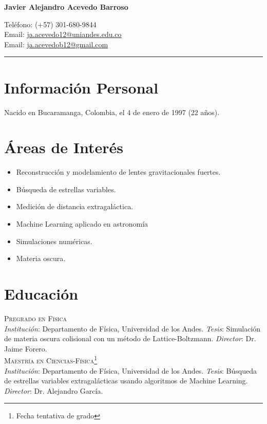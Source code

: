 \documentclass[11pt, a4paper]{article}
\newcommand{\years}[1]{\marginnote{\scriptsize #1}}
\begin{document}
\begin{center}{\huge \bf Javier Alejandro Acevedo Barroso}\\[1cm]\end{center}
\begin{minipage}[t]{0.465\textwidth}
  Teléfono: (+57) 301-680-9844 \\
  Email: \href{mailto:ja.acevedo12@uniandes.edu.co}{ja.acevedo12@uniandes.edu.co}\\
  Email: \href{mailto:ja.acevedob12@gmail.com}{ja.acevedob12@gmail.com}\\
\end{minipage}

\hrule

\section*{Información Personal}
Nacido en Bucaramanga, Colombia, el 4 de enero de 1997 (22 años).

\section*{Áreas de Interés}
\begin{itemize}
\item Reconstrucción y modelamiento de lentes gravitacionales fuertes.
\item Búsqueda de estrellas variables.
\item Medición de distancia extragaláctica.
\item Machine Learning aplicado en astronomía
\item Simulaciones numéricas.
\item Materia oscura.
\end{itemize}

\section*{Educación}
\noindent
\years{2015-2019}\textsc{Pregrado en Física}\\ {\emph{Institución}}: Departamento de Física, Universidad de los Andes. {\emph{Tesis}}: Simulación de materia oscura colisional con un método de Lattice-Boltzmann. {\emph{Director}}: Dr. Jaime Forero.\\

\years{2019-2020}\textsc{Maestría en Ciencias-Física\footnote{Fecha tentativa de grado}}\\ {\emph{Institución}}: Departamento de Física, Universidad de los Andes. {\emph{Tesis}}: Búsqueda de estrellas variables extragalácticas usando algoritmos de Machine Learning. {\emph{Director}}: Dr. Alejandro García.\\
\end{document}
